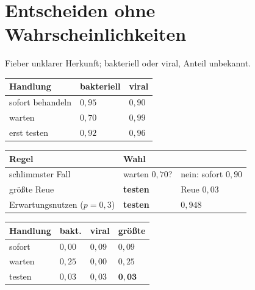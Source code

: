\section{Entscheiden ohne Wahrscheinlichkeiten}

\begin{merksatz}
Fieber unklarer Herkunft; bakteriell oder viral, Anteil unbekannt.

\begin{center}
{\small
\renewcommand{\arraystretch}{1.5}
\begin{tabular}{@{}P{2.4cm}P{2.4cm}P{2.4cm}@{}}
\toprule
\textbf{Handlung} & \textbf{bakteriell} & \textbf{viral}\\
\midrule
sofort behandeln & $0{,}95$ & $0{,}90$\\
warten & $0{,}70$ & $0{,}99$\\
erst testen & $0{,}92$ & $0{,}96$\\
\bottomrule
\end{tabular}}
\end{center}

\begin{center}
{\small
\renewcommand{\arraystretch}{1.5}
\begin{tabular}{@{}P{2.8cm}P{2.6cm}P{2.6cm}@{}}
\toprule
\textbf{Regel} & \textbf{Wahl} & \\
\midrule
schlimmster Fall & warten $0{,}70$? & nein: sofort $0{,}90$\\
größte Reue & \textbf{testen} & Reue $0{,}03$\\
Erwartungs\-nutzen ($p = 0{,}3$) & \textbf{testen} & $0{,}948$\\
\bottomrule
\end{tabular}}
\end{center}

\begin{center}
{\small
\renewcommand{\arraystretch}{1.48}
\begin{tabular}{@{}P{2.4cm}P{2.0cm}P{2.0cm}P{2.0cm}@{}}
\toprule
\textbf{Handlung} & \textbf{bakt.} & \textbf{viral} & \textbf{größte}\\
\midrule
sofort & $0{,}00$ & $0{,}09$ & $0{,}09$\\
warten & $0{,}25$ & $0{,}00$ & $0{,}25$\\
testen & $0{,}03$ & $0{,}03$ & $\mathbf{0{,}03}$\\
\bottomrule
\end{tabular}}
\end{center}


\end{merksatz}
